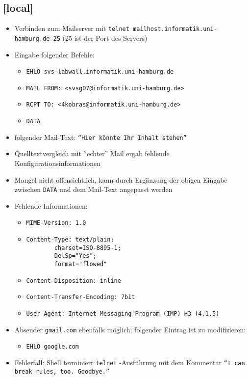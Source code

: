 \documentclass[twoside]{article}
\newcommand{\ttt}[1]{%
	\texttt{#1}%
}
\begin{document}
\subsection{[local]}
\begin{itemize}
	\item Verbinden zum Mailserver mit \ttt{telnet mailhost.informatik.uni-hamburg.de 25} (25 ist der Port des Servers)
	\item Eingabe folgender Befehle:
	\begin{itemize}
		\item \ttt{EHLO svs-labwall.informatik.uni-hamburg.de}
		\item \ttt{MAIL FROM: <svsg07@informatik.uni-hamburg.de>}
		\item \ttt{RCPT TO: <4kobras@informatik.uni-hamburg.de>}
		\item \ttt{DATA}
	\end{itemize}
	\item folgender Mail-Text: \ttt{``Hier könnte Ihr Inhalt stehen''}
	\item Quelltextvergleich mit ``echter'' Mail ergab fehlende Konfigurationsinformationen
	\item Mangel nicht offensichtlich, kann durch Ergänzung der obigen Eingabe zwischen \ttt{DATA} und dem Mail-Text angepasst werden
	\item Fehlende Informationen:
	\begin{itemize}
		\item \ttt{MIME-Version: 1.0}
		\item \ttt{Content-Type: text/plain;\\
				\-~~~~~~~~charset=ISO-8895-1;\\
				\-~~~~~~~~DelSp="Yes";\\
				\-~~~~~~~~format="flowed"}
		\item \ttt{Content-Disposition: inline}
		\item \ttt{Content-Transfer-Encoding: 7bit}
		\item \ttt{User-Agent: Internet Messaging Program (IMP) H3 (4.1.5)}
	\end{itemize}
	\item Absender \ttt{gmail.com} ebenfalls möglich; folgender Eintrag ist zu modifizieren:
	\begin{itemize}
		\item \ttt{EHLO google.com}
	\end{itemize}
	\item Fehlerfall: Shell terminiert \ttt{telnet}-Ausführung mit dem Kommentar \ttt{``I can break rules, too. Goodbye.''}
\end{itemize}
\end{document}
